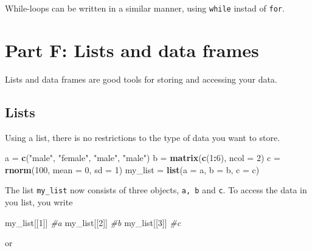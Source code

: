 \documentclass[]{article}
\newenvironment{Shaded}{\begin{snugshade}}{\end{snugshade}}
\newcommand{\KeywordTok}[1]{\textcolor[rgb]{0.13,0.29,0.53}{\textbf{#1}}}
\newcommand{\DataTypeTok}[1]{\textcolor[rgb]{0.13,0.29,0.53}{#1}}
\newcommand{\DecValTok}[1]{\textcolor[rgb]{0.00,0.00,0.81}{#1}}
\newcommand{\StringTok}[1]{\textcolor[rgb]{0.31,0.60,0.02}{#1}}
\newcommand{\CommentTok}[1]{\textcolor[rgb]{0.56,0.35,0.01}{\textit{#1}}}
\newcommand{\OperatorTok}[1]{\textcolor[rgb]{0.81,0.36,0.00}{\textbf{#1}}}
\newcommand{\NormalTok}[1]{#1}
\begin{document}
While-loops can be written in a similar manner, using \texttt{while}
instad of \texttt{for}.

\section{Part F: Lists and data
frames}\label{part-f-lists-and-data-frames}

Lists and data frames are good tools for storing and accessing your
data.

\subsection{Lists}\label{lists}

Using a list, there is no restrictions to the type of data you want to
store.

\begin{Shaded}
\begin{Highlighting}[]
\NormalTok{a =}\StringTok{ }\KeywordTok{c}\NormalTok{(}\StringTok{"male"}\NormalTok{, }\StringTok{"female"}\NormalTok{, }\StringTok{"male"}\NormalTok{, }\StringTok{"male"}\NormalTok{)}
\NormalTok{b =}\StringTok{ }\KeywordTok{matrix}\NormalTok{(}\KeywordTok{c}\NormalTok{(}\DecValTok{1}\OperatorTok{:}\DecValTok{6}\NormalTok{), }\DataTypeTok{ncol =} \DecValTok{2}\NormalTok{)}
\NormalTok{c =}\StringTok{ }\KeywordTok{rnorm}\NormalTok{(}\DecValTok{100}\NormalTok{, }\DataTypeTok{mean =} \DecValTok{0}\NormalTok{, }\DataTypeTok{sd =} \DecValTok{1}\NormalTok{)}
\NormalTok{my_list =}\StringTok{ }\KeywordTok{list}\NormalTok{(}\DataTypeTok{a =}\NormalTok{ a, }\DataTypeTok{b =}\NormalTok{ b, }\DataTypeTok{c =}\NormalTok{ c)}
\end{Highlighting}
\end{Shaded}

The list \texttt{my\_list} now consists of three objects, \texttt{a,\ b}
and \texttt{c}. To access the data in you list, you write

\begin{Shaded}
\begin{Highlighting}[]
\NormalTok{my_list[[}\DecValTok{1}\NormalTok{]]  }\CommentTok{#a}
\NormalTok{my_list[[}\DecValTok{2}\NormalTok{]]  }\CommentTok{#b}
\NormalTok{my_list[[}\DecValTok{3}\NormalTok{]]  }\CommentTok{#c}
\end{Highlighting}
\end{Shaded}

or

\begin{Shaded}
\end{Shaded}
\end{document}

